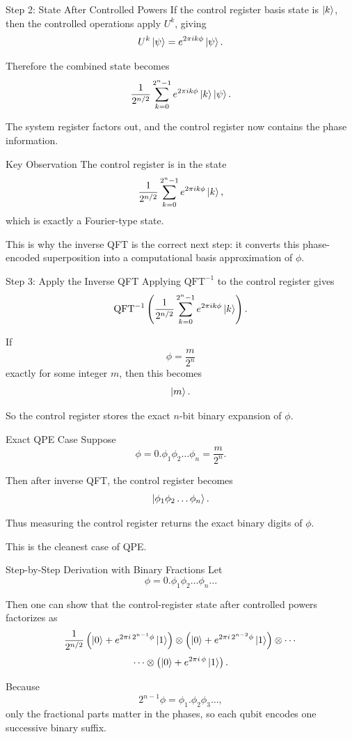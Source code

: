 \documentclass{beamer}
\begin{document}
\begin{frame}{Step 2: State After Controlled Powers}
If the control register basis state is \(\ket{k}\), then the controlled operations apply \(U^k\), giving
\[
U^k\ket{\psi} = e^{2\pi i k\phi}\ket{\psi}.
\]

Therefore the combined state becomes
\[
\frac{1}{2^{n/2}}
\sum_{k=0}^{2^n-1}
e^{2\pi i k\phi}\ket{k}\ket{\psi}.
\]

The system register factors out, and the control register now contains the phase information.
\end{frame}

\begin{frame}{Key Observation}
The control register is in the state
\[
\frac{1}{2^{n/2}}
\sum_{k=0}^{2^n-1} e^{2\pi i k\phi}\ket{k},
\]
which is exactly a Fourier-type state.

This is why the inverse QFT is the correct next step:
it converts this phase-encoded superposition into a computational basis approximation of \(\phi\).
\end{frame}

\begin{frame}{Step 3: Apply the Inverse QFT}
Applying \(\mathrm{QFT}^{-1}\) to the control register gives
\[
\mathrm{QFT}^{-1}
\left(
\frac{1}{2^{n/2}}
\sum_{k=0}^{2^n-1} e^{2\pi i k\phi}\ket{k}
\right).
\]

If
\[
\phi = \frac{m}{2^n}
\]
exactly for some integer \(m\), then this becomes
\[
\ket{m}.
\]

So the control register stores the exact \(n\)-bit binary expansion of \(\phi\).
\end{frame}

\begin{frame}{Exact QPE Case}
Suppose
\[
\phi = 0.\phi_1\phi_2\dots\phi_n
=
\frac{m}{2^n}.
\]

Then after inverse QFT, the control register becomes
\[
\ket{\phi_1\phi_2\dots\phi_n}.
\]

Thus measuring the control register returns the exact binary digits of \(\phi\).

This is the cleanest case of QPE.
\end{frame}

\begin{frame}{Step-by-Step Derivation with Binary Fractions}
Let
\[
\phi = 0.\phi_1\phi_2\dots\phi_n\dots
\]

Then one can show that the control-register state after controlled powers factorizes as
\[
\frac{1}{2^{n/2}}
\left(\ket0 + e^{2\pi i\, 2^{n-1}\phi}\ket1\right)
\otimes
\left(\ket0 + e^{2\pi i\, 2^{n-2}\phi}\ket1\right)
\otimes \cdots
\]
\[
\cdots \otimes
\left(\ket0 + e^{2\pi i\, \phi}\ket1\right).
\]

Because
\[
2^{n-1}\phi = \phi_1.\phi_2\phi_3\dots,
\]
only the fractional parts matter in the phases, so each qubit encodes one successive binary suffix.
\end{frame}
\end{document}
